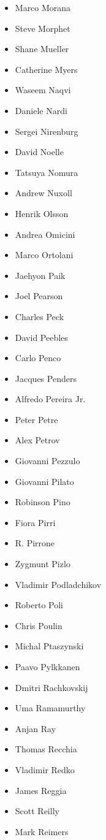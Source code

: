 \documentclass[10pt,fleqn,openany]{book} %
\begin{document}
\begin{multicols}{2}
\begin{itemize}
			\item Marco Morana
			\item Steve Morphet
			\item Shane Mueller
			\item Catherine Myers
			\item Waseem Naqvi
			\item Daniele Nardi
			\item Sergei Nirenburg
			\item David Noelle
			\item Tatsuya Nomura
			\item Andrew Nuxoll
			\item Henrik Olsson
			\item Andrea Omicini
			\item Marco Ortolani
			\item Jaehyon Paik
			\item Joel Pearson
			\item Charles Peck
			\item David Peebles
			\item Carlo Penco
			\item Jacques Penders
			\item Alfredo Pereira Jr.
			\item Peter Petre
			\item Alex Petrov
			\item Giovanni Pezzulo
			\item Giovanni Pilato
			\item Robinson Pino
			\item Fiora Pirri
			\item R. Pirrone
			\item Zygmunt Pizlo
			\item Vladimir Podladchikov
			\item Roberto Poli
			\item Chris Poulin
			\item Michal Ptaszynski
			\item Paavo Pylkkanen
			\item Dmitri Rachkovskij
			\item Uma Ramamurthy
			\item Anjan Ray
			\item Thomas Recchia
			\item Vladimir Redko
			\item James Reggia
			\item Scott Reilly
			\item Mark Reimers

\end{itemize}
\end{multicols}
\end{document}
